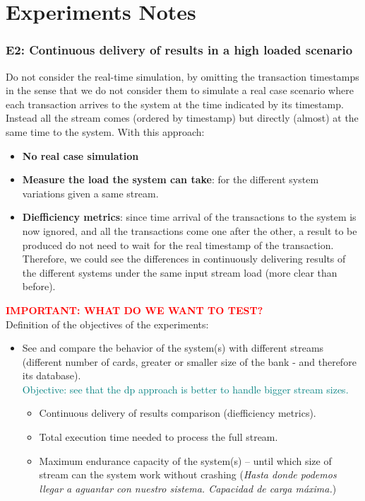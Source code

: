 

\section{Experiments Notes}

\subsubsection{E2: Continuous delivery of results in a high loaded scenario}

Do not consider the real-time simulation, by omitting the transaction timestamps in the sense that we do not consider them to simulate a real case scenario where each transaction arrives to the system at the time indicated by its timestamp. 
Instead all the stream comes (ordered by timestamp) but directly (almost) at the same time to the system. With this approach:
\begin{itemize}
  \item \textbf{No real case simulation}
  \item \textbf{Measure the load the system can take}: for the different system variations given a same stream.
  \item \textbf{Diefficiency metrics}: since time arrival of the transactions to the system is now ignored, and all the transactions come one after the other, a result to be produced do not need to wait for the real timestamp of the transaction. Therefore, we could see the differences in continuously delivering results of the different systems under the same input stream load (more clear than before).
\end{itemize}

\begin{tcolorbox}[colframe=red!75]
\textcolor{red}{\textbf{IMPORTANT: WHAT DO WE WANT TO TEST?\\}}
Definition of the objectives of the experiments:
\begin{itemize}
    \item See and compare the behavior of the system(s) with different streams (different number of cards, greater or smaller size of the bank - and therefore its database). \\
    \textcolor{teal}{Objective: see that the dp approach is better to handle bigger stream sizes.}
    \begin{itemize}
        \item Continuous delivery of results comparison (diefficiency metrics).
        \item Total execution time needed to process the full stream.
        \item Maximum endurance capacity of the system(s) -- until which size of stream can the system work without crashing (\textit{Hasta donde podemos llegar a aguantar con nuestro sistema. Capacidad de carga máxima.})
    \end{itemize}
\end{itemize}
\end{tcolorbox}

